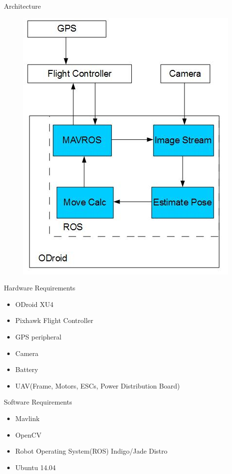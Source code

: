 \documentclass[11pt]{beamer}
\begin{document}
\begin{frame}{Architecture}
\begin{figure}
\includegraphics[width=.5\textwidth]{images/broad_approach1}
\end{figure}

\end{frame}

\begin{frame}{Hardware Requirements}
\begin{itemize}
\item ODroid XU4
\item Pixhawk Flight Controller
\item GPS peripheral
\item Camera
\item Battery
\item UAV(Frame, Motors, ESCs, Power Distribution Board)
\end{itemize}

\end{frame}

\begin{frame}{Software Requirements}
\begin{itemize}
\item Mavlink
\item OpenCV
\item Robot Operating System(ROS) Indigo/Jade Distro
\item Ubuntu 14.04
\end{itemize}

\end{frame}
\end{document}

